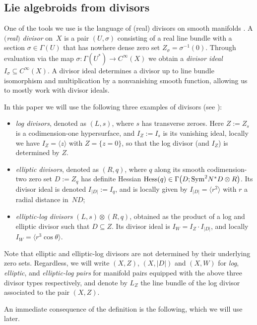 \documentclass[10pt,a4paper]{amsart}
\numberwithin{equation}{section}
\begin{document}
\subsection{Lie algebroids from divisors}

One of the tools we use is the language of (real) divisors on smooth manifolds \cite{CavalcantiKlaasse18,Klaasse18}. A \emph{$($real$)$ divisor} on~$X$ is a pair $(U,\sigma)$ consisting of a real line bundle with a section $\sigma \in \Gamma(U)$ that has nowhere dense zero set $Z_\sigma = \sigma^{-1}(0)$. Through evaluation via the map $\sigma\colon \Gamma(U^*) \to C^\infty(X)$ we obtain a \emph{divisor ideal} $I_\sigma \subseteq C^\infty(X)$. A divisor ideal determines a divisor up to line bundle isomorphism and multiplication by a nonvanishing smooth function, allowing us to mostly work with divisor ideals.

In this paper we will use the following three examples of divisors (see \cite{CavalcantiGualtieri18,CavalcantiKlaasse18,Klaasse18}):
\begin{itemize}\itemsep=0pt
\item \emph{log divisors}, denoted as $(L,s)$, where $s$ has transverse zeroes. Here $Z := Z_s$ is a co\-di\-men\-sion-one hypersurface, and $I_Z := I_s$ is its vanishing ideal, locally we have $I_Z = \langle z \rangle$ with $Z = \{z = 0\}$, so that the log divisor (and $I_Z$) is determined by $Z$.
\item \emph{elliptic divisors}, denoted as $(R,q)$, where $q$ along its smooth codimension-two zero set $D := Z_q$ has definite Hessian ${\rm Hess}(q) \in \Gamma\big(D;{\rm Sym}^2 N^*D \otimes R\big)$. Its divisor ideal is denoted $I_{|D|} := I_q$, and is locally given by $I_{|D|} = \big\langle r^2 \big\rangle$ with $r$ a radial distance in~$ND$;
\item \emph{elliptic-log divisors} $(L,s) \otimes (R,q)$, obtained as the product of a log and elliptic divisor such that $D \subseteq Z$. Its divisor ideal is $I_W = I_Z \cdot I_{|D|}$, and locally $I_W = \big\langle r^3 \cos \theta \big\rangle$.
\end{itemize}
Note that elliptic and elliptic-log divisors are not determined by their underlying zero sets. Regardless, we will write $(X,Z)$, $(X,|D|)$ and $(X,W)$ for \emph{log}, \emph{elliptic}, and \emph{elliptic-log pairs} for manifold pairs equipped with the above three divisor types respectively, and denote by $L_Z$ the line bundle of the log divisor associated to the pair $(X,Z)$.

An immediate consequence of the definition is the following, which we will use later.
\end{document}
